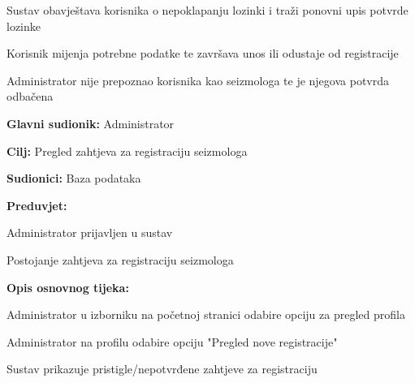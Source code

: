 \begin{packed_item}
\begin{packed_item}
\begin{packed_enum}
								\item Sustav obavještava korisnika o nepoklapanju lozinki i traži ponovni upis potvrde lozinke
								\item Korisnik mijenja potrebne podatke te završava unos ili odustaje od registracije
								
							\end{packed_enum} 
							\item[4.a] Administrator nije prepoznao korisnika kao seizmologa te je njegova potvrda odbačena
							
						\end{packed_item}
					\end{packed_item}

					\noindent {}
					\begin{packed_item}
	
						\item \textbf{Glavni sudionik:} Administrator
						\item \textbf{Cilj:} Pregled zahtjeva za registraciju seizmologa
						\item \textbf{Sudionici:} Baza podataka
						\item \textbf{Preduvjet:} 
							\begin{packed_item}
								\item Administrator prijavljen u sustav
								\item Postojanje zahtjeva za registraciju seizmologa
							\end{packed_item}
						\item  \textbf{Opis osnovnog tijeka:}
						
						\item[] \begin{packed_enum}
	
							\item Administrator u izborniku na početnoj stranici odabire opciju za pregled profila
							\item Administrator na profilu odabire opciju "Pregled nove registracije"
							\item Sustav prikazuje pristigle/nepotvrđene zahtjeve za registraciju 

						\end{packed_enum}						
					\end{packed_item}

